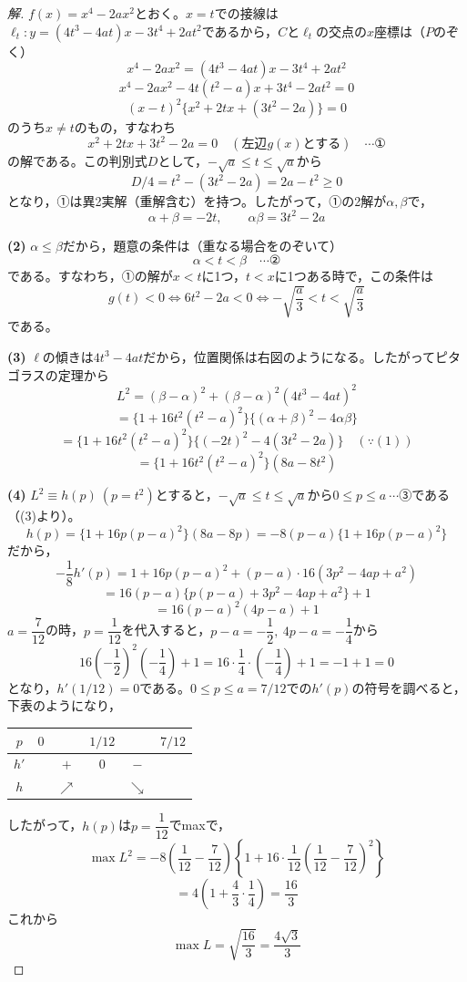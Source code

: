 \documentclass[../main.tex]{subfiles}
\begin{document}
\begin{proof}[解]
  $f(x)=x^4-2ax^2$とおく。$x=t$での接線は$\ell_t: y=(4t^3-4at)x-3t^4+2at^2$であるから，$C$と$\ell_t$の交点の$x$座標は（$P$のぞく）
  \[
    x^4-2ax^2=(4t^3-4at)x-3t^4+2at^2
  \]
  \[
    x^4-2ax^2-4t(t^2-a)x+3t^4-2at^2=0
  \]
  \[
    (x-t)^2\{x^2+2tx+(3t^2-2a)\}=0
  \]
  のうち$x\ne t$のもの，すなわち
  \[
    x^2+2tx+3t^2-2a=0 \quad(\text{左辺}g(x)\text{とする}) \quad\cdots\text{①}
  \]
  の解である。この判別式$D$として，$-\sqrt a\le t\le\sqrt a$から
  \[
    D/4=t^2-(3t^2-2a)=2a-t^2\ge0
  \]
  となり，①は異2実解（重解含む）を持つ。したがって，①の2解が$\alpha,\beta$で，
  \[
    \alpha+\beta=-2t, \qquad \alpha\beta=3t^2-2a
  \]

  \textbf{(2)} $\alpha\le\beta$だから，題意の条件は（重なる場合をのぞいて）
  \[
    \alpha<t<\beta \quad\cdots\text{②}
  \]
  である。すなわち，①の解が$x<t$に1つ，$t<x$に1つある時で，この条件は
  \[
    g(t)<0 \iff 6t^2-2a<0 \iff -\sqrt{\frac{a}{3}}<t<\sqrt{\frac{a}{3}}
  \]
  である。

  \textbf{(3)} $\ell$の傾きは$4t^3-4at$だから，位置関係は右図のようになる。したがってピタゴラスの定理から
  \[
    L^2=(\beta-\alpha)^2+(\beta-\alpha)^2(4t^3-4at)^2
  \]
  \[
    =\{1+16t^2(t^2-a)^2\}\{(\alpha+\beta)^2-4\alpha\beta\}
  \]
  \[
    =\{1+16t^2(t^2-a)^2\}\{(-2t)^2-4(3t^2-2a)\} \quad(\because(1))
  \]
  \[
    =\{1+16t^2(t^2-a)^2\}(8a-8t^2)
  \]

  \textbf{(4)} $L^2\equiv h(p)\ (p=t^2)$とすると，$-\sqrt a\le t\le\sqrt a$から$0\le p\le a\ \cdots$③である（(3)より）。
  \[
    h(p)=\{1+16p(p-a)^2\}(8a-8p)=-8(p-a)\{1+16p(p-a)^2\}
  \]
  だから，
  \[
    -\frac18h'(p)=1+16p(p-a)^2+(p-a)\cdot16(3p^2-4ap+a^2)
  \]
  \[
    =16(p-a)\{p(p-a)+3p^2-4ap+a^2\}+1
  \]
  \[
    =16(p-a)^2(4p-a)+1
  \]
  $a=\dfrac{7}{12}$の時，$p=\dfrac1{12}$を代入すると，$p-a=-\dfrac12,\ 4p-a=-\dfrac14$から
  \[
    16\left(-\frac12\right)^2\left(-\frac14\right)+1=16\cdot\frac14\cdot\left(-\frac14\right)+1=-1+1=0
  \]
  となり，$h'(1/12)=0$である。$0\le p\le a=7/12$での$h'(p)$の符号を調べると，下表のようになり，
  \begin{center}
    \begin{tabular}{c|ccccc}
      $p$ & $0$ & & $1/12$ & & $7/12$ \\
      \hline
      $h'$ & & $+$ & $0$ & $-$ & \\
      \hline
      $h$ & & $\nearrow$ & & $\searrow$ &
    \end{tabular}
  \end{center}
  したがって，$h(p)$は$p=\dfrac1{12}$でmaxで，
  \[
    \max L^2=-8\left(\frac1{12}-\frac{7}{12}\right)\left\{1+16\cdot\frac1{12}\left(\frac1{12}-\frac{7}{12}\right)^2\right\}
  \]
  \[
    =4\left(1+\frac43\cdot\frac14\right)=\frac{16}{3}
  \]
  これから
  \[
    \max L=\sqrt{\frac{16}{3}}=\frac{4\sqrt3}{3}
  \]
\end{proof}
\end{document}
